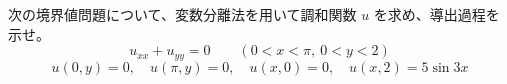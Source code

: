
次の境界値問題について、変数分離法を用いて調和関数 $u$ を求め、導出過程を示せ。
\[
u_{xx} + u_{yy} = 0 \qquad (0 < x < \pi,\ 0 < y < 2)
\]
\[
u(0, y) = 0, \quad u(\pi, y) = 0, \quad u(x, 0) = 0, \quad u(x, 2) = 5\sin 3x
\]

